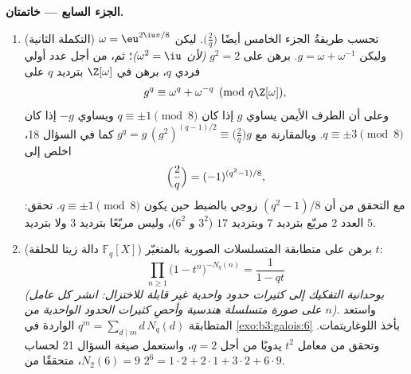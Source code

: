\begin{problem}
\medskip
\noindent\textbf{الجزء السابع --- خاتمتان.}
\begin{enumerate}[resume]
  \item (التكملة الثانية) تحسب طريقةُ الجزء الخامس أيضًا $\bigl(\frac2q\bigr)$.
        ليكن $\omega = \eu^{2\iu\pi/8}$ وليكن $g = \omega + \omega^{-1}$. برهن على $g^2 = 2$
        \emph{(لأن $\omega^2 = \iu$)}؛ ثم، من أجل عدد أولي فردي
        $q$، برهن في $\Z[\omega]$ بترديد $q$ على
        \[
        g^q \equiv \omega^q + \omega^{-q} \pmod{q\Z[\omega]},
        \]
        وعلى أن الطرف الأيمن يساوي $g$ إذا كان $q \equiv \pm1
        \pmod 8$ ويساوي
        $-g$ إذا كان $q \equiv \pm3 \pmod 8$. وبالمقارنة مع $g^q = g\,(g^2)^{(q-1)/2} \equiv
        \bigl(\frac2q\bigr)g$ كما في
        السؤال 18، اخلص إلى
        \[
        \Bigl(\frac2q\Bigr) = (-1)^{(q^2-1)/8},
        \]
        مع التحقق من أن $(q^2 - 1)/8$ زوجي بالضبط حين يكون
        $q
        \equiv \pm1 \pmod 8$. تحقق: العدد $2$ مربّع بترديد $7$ وبترديد $17$
        ($3^2$ و $6^2$)، وليس مربّعًا بترديد $3$ ولا بترديد $5$.
  \item (دالة زيتا للحلقة $\mathbb F_q[X]$) برهن على متطابقة
        المتسلسلات الصورية بالمتغيّر $t$:
        \[
        \prod_{n \geq 1}\bigl(1 - t^n\bigr)^{-N_q(n)}
        = \frac1{1 - qt}
        \]
        \emph{(بوحدانية التفكيك إلى كثيرات حدود واحدية غير قابلة
        للاختزال: انشر كل عامل على صورة متسلسلة هندسية وأحصِ
        كثيرات الحدود الواحدية من  $n$)}. واستعد المتطابقة
        $q^m = \sum_{d \mid m}d\,N_q(d)$ الواردة في \cref{exo:b3:galois:6} بأخذ اللوغاريتمات. وتحقق
        من معامل $t^2$ يدويًا من أجل $q = 2$، واستعمل صيغة
        السؤال 21 لحساب $N_2(6) = 9$، متحققًا من $2^6 = 1\cdot2 + 2\cdot1 + 3\cdot2 +
        6\cdot9$.
\end{enumerate}
\end{problem}

